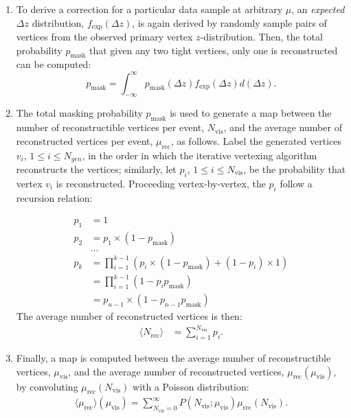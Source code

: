 \begin{enumerate}
	\item To derive a correction for a particular data sample at arbitrary $\mu$, an \emph{expected} $\Delta z$ distribution, $f_{\mathrm{exp}}(\Delta z)$, is again derived by randomly sample pairs of vertices from the observed primary vertex $z$-distribution. Then, the total probability $p_{\textrm{mask}}$ that given any two tight vertices, only one is reconstructed can be computed: 
	\begin{equation}
		p_{\textrm{mask}} = \int_{-\infty}^{\infty} p_{\textrm{mask}}(\Delta z) f_{\mathrm{exp}}(\Delta z) d(\Delta z).
	\end{equation}
	
	\item The total masking probability $p_{\textrm{mask}}$ is used to generate a map between the number of reconstructible vertices per event, $N_{\textrm{vis}}$, and the average number of reconstructed vertices per event, $\mu_{\textrm{rec}}$, as follows. Label the generated vertices $v_i$, $1 \leq i \leq N_{gen}$, in the order in which the iterative vertexing algorithm reconstructs the vertices; similarly, let $p_i$, $1\leq i \leq N_{\textrm{vis}}$, be the probability that vertex $v_i$ is reconstructed. Proceeding vertex-by-vertex, the $p_i$ follow a recursion relation:

	\begin{align}
		p_1 &= 1\\
		p_2 &= p_1 \times (1 - p_{\textrm{mask}})\\
		&... \\
		p_k &= \prod_{i=1}^{k-1} \left( p_i  \times (1-p_{\textrm{mask}}) + (1-p_i) \times 1\right)\\
		&= \prod_{i=1}^{k-1} \left(1 - p_i p_{\textrm{mask}}\right)\\
		&= p_{n-1} \times \left(1-p_{n-1} p_{\textrm{mask}}\right)
	\end{align}
	The average number of reconstructed vertices is then:
	\begin{align}
		\langle N_{\textrm{rec}} \rangle &= \sum_{i=1}^{N_{\textrm{vis}}} p_i.
	\end{align}
	
	\item Finally, a map is computed between the average number of reconstructible vertices, $\mu_{\textrm{vis}}$, and the average number of reconstructed vertices, $ \mu_{\textrm{rec}}(\mu_{\textrm{vis}})$, by convoluting $\mu_{\textrm{rec}}(N_{\textrm{vis}})$ with a Poisson distribution:
	\begin{align}
		\langle \mu_{\textrm{rec}} \rangle (\mu_{\textrm{vis}}) = \sum_{N_{\textrm{vis}}=0}^{\infty} P(N_{\textrm{vis}}; \mu_{\textrm{vis}}) \mu_{\textrm{rec}} (N_{\textrm{vis}}).
	\end{align}
\end{enumerate}

